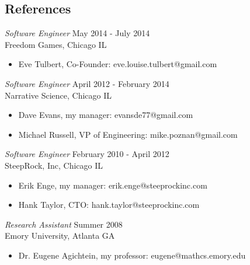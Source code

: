 \documentclass[line,margin]{res}
\begin{document}
\address{waltaskew@gmail.com}
\address{404-819-9796}

\begin{resume}

\section{References}
        {\sl Software Engineer} \hfill May 2014 - July 2014 \\
        Freedom Games, Chicago IL
        \begin{itemize}
          \item Eve Tulbert, Co-Founder: eve.louise.tulbert@gmail.com
        \end{itemize}
        {\sl Software Engineer} \hfill April 2012 - February 2014 \\
        Narrative Science, Chicago IL
        \begin{itemize}
          \item Dave Evans, my manager: evansde77@gmail.com
          \item Michael Russell, VP of Engineering: mike.poznan@gmail.com
        \end{itemize}

        {\sl Software Engineer} \hfill February 2010 - April 2012 \\
        SteepRock, Inc, Chicago IL
        \begin{itemize}
          \item Erik Enge, my manager: erik.enge@steeprockinc.com
          \item Hank Taylor, CTO: hank.taylor@steeprockinc.com
        \end{itemize}

        {\sl Research Assistant} \hfill Summer 2008 \\
        Emory University, Atlanta GA
        \begin{itemize}
          \item Dr. Eugene Agichtein, my professor: eugene@mathcs.emory.edu
        \end{itemize}

\end{resume}
\end{document}
